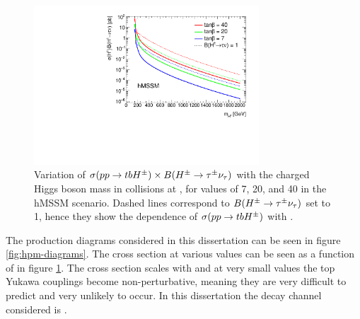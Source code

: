 	\begin{figure}[!ht]
		\centering
		\includegraphics[width=0.75\textwidth]{chapters/chapter2_theory/images/XSBR_hmssm.pdf}
		\caption{\label{fig:hpm-xsec} Variation of $\sigma(pp \to tbH^{\pm}) \times B(H^{\pm} \to \tau^{\pm} \nu_{\tau})$ with the charged Higgs boson mass in \pp collisions at \sqs, for \tanb values of 7, 20, and 40 in the hMSSM scenario. Dashed lines correspond to $B(H^{\pm} \to \tau^{\pm} \nu_{\tau})$ set to 1, hence they show the dependence of $\sigma(pp \to tbH^{\pm})$ with \mHpm. \cite{hpm-previous} }
	\end{figure}
	The production diagrams considered in this dissertation can be seen in figure \ref{fig:hpm-diagrams}. The cross section at various \tanb values can be seen as a function of \mHpm in figure \ref{fig:hpm-xsec}. The cross section scales with \tanb and at very small values the top Yukawa couplings become non-perturbative, meaning they are very difficult to predict and very unlikely to occur. In this dissertation the decay channel considered is \HpmLong. 
